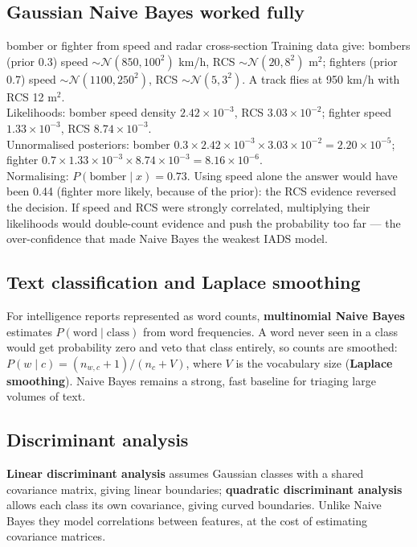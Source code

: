 \documentclass[11pt]{article}
\begin{document}
\subsection{Gaussian Naive Bayes worked fully}
\begin{example}{bomber or fighter from speed and radar cross-section}
Training data give: bombers (prior 0.3) speed $\sim\mathcal N(850,100^2)$ km/h, RCS $\sim\mathcal N(20,8^2)$ m$^2$; fighters (prior 0.7) speed $\sim\mathcal N(1100,250^2)$, RCS $\sim\mathcal N(5,3^2)$. A track flies at 950 km/h with RCS 12 m$^2$.\\
Likelihoods: bomber speed density $2.42\times10^{-3}$, RCS $3.03\times10^{-2}$; fighter speed $1.33\times10^{-3}$, RCS $8.74\times10^{-3}$.\\
Unnormalised posteriors: bomber $0.3\times2.42\times10^{-3}\times3.03\times10^{-2}=2.20\times10^{-5}$; fighter $0.7\times1.33\times10^{-3}\times8.74\times10^{-3}=8.16\times10^{-6}$.\\
Normalising: $P(\text{bomber}\mid x)=0.73$. Using speed alone the answer would have been 0.44 (fighter more likely, because of the prior): the RCS evidence reversed the decision. If speed and RCS were strongly correlated, multiplying their likelihoods would double-count evidence and push the probability too far --- the over-confidence that made Naive Bayes the weakest IADS model.
\end{example}
\subsection{Text classification and Laplace smoothing}
For intelligence reports represented as word counts, \textbf{multinomial Naive Bayes} estimates $P(\text{word}\mid\text{class})$ from word frequencies. A word never seen in a class would get probability zero and veto that class entirely, so counts are smoothed: $P(w\mid c)=(n_{w,c}+1)/(n_c+V)$, where $V$ is the vocabulary size (\textbf{Laplace smoothing}). Naive Bayes remains a strong, fast baseline for triaging large volumes of text.
\subsection{Discriminant analysis}
\textbf{Linear discriminant analysis} assumes Gaussian classes with a shared covariance matrix, giving linear boundaries; \textbf{quadratic discriminant analysis} allows each class its own covariance, giving curved boundaries. Unlike Naive Bayes they model correlations between features, at the cost of estimating covariance matrices.
\end{document}
